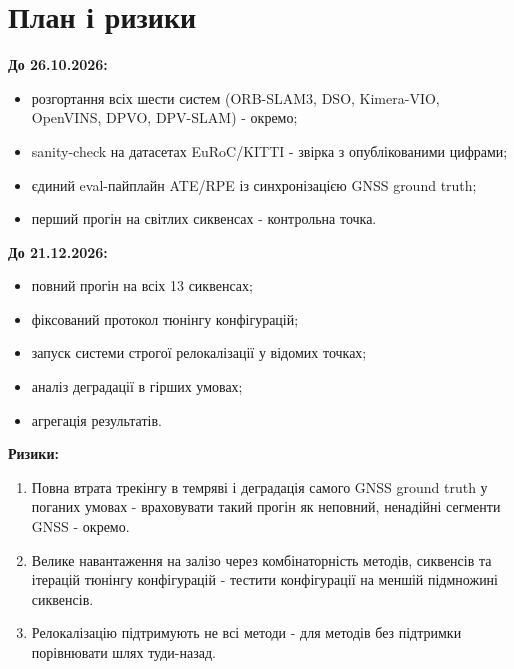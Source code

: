 \documentclass[ukrainian]{ucuproposal}
\begin{document}
\section{План і ризики}
\textbf{До 26.10.2026:}
\begin{itemize}
  \item розгортання всіх шести систем (ORB-SLAM3, DSO, Kimera-VIO, OpenVINS, DPVO, DPV-SLAM) - окремо;
  \item sanity-check на датасетах EuRoC/KITTI - звірка з опублікованими цифрами;
  \item єдиний eval-пайплайн ATE/RPE із синхронізацією GNSS ground truth;
  \item перший прогін на світлих сиквенсах - контрольна точка.
\end{itemize}

\textbf{До 21.12.2026:}
\begin{itemize}
  \item повний прогін на всіх 13 сиквенсах;
  \item фіксований протокол тюнінгу конфігурацій;
  \item запуск системи строгої релокалізації у відомих точках;
  \item аналіз деградації в гірших умовах;
  \item агрегація результатів.
\end{itemize}

\textbf{Ризики:}
\begin{enumerate}
  \item Повна втрата трекінгу в темряві і деградація самого GNSS ground
    truth у поганих умовах - враховувати такий прогін як неповний,
    ненадійні сегменти GNSS - окремо.
  \item Велике навантаження на залізо через комбінаторність методів,
    сиквенсів та ітерацій тюнінгу конфігурацій - тестити
    конфігурації на меншій підмножині сиквенсів.
  \item Релокалізацію підтримують не всі методи - для методів без
    підтримки порівнювати шлях туди-назад.
\end{enumerate}

\end{document}

